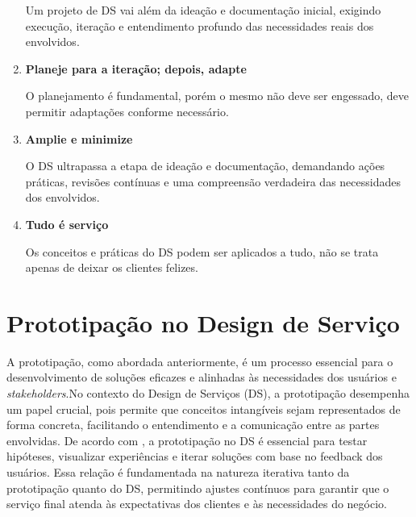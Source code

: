 \begin{enumerate}
	Um projeto de DS vai além da ideação e documentação inicial, exigindo execução, iteração e entendimento profundo das necessidades reais dos envolvidos.
	
	\item \textbf{Planeje para a iteração; depois, adapte}
	
	O planejamento é fundamental, porém o mesmo não deve ser engessado, deve permitir adaptações conforme necessário.
	
	\item \textbf{Amplie e minimize}
	
	O DS ultrapassa a etapa de ideação e documentação, demandando ações práticas, revisões contínuas e uma compreensão verdadeira das necessidades dos envolvidos.
	
	\item \textbf{Tudo é serviço}
	
	Os conceitos e práticas do DS podem ser aplicados a tudo, não se trata apenas de deixar os clientes felizes.
	
\end{enumerate}

\section{Prototipação no Design de Serviço}

A prototipação, como abordada anteriormente, é um processo essencial para o desenvolvimento de soluções eficazes e alinhadas às necessidades dos usuários e \textit{stakeholders}.No contexto do Design de Serviços (DS), a prototipação desempenha um papel crucial, pois permite que conceitos intangíveis sejam representados de forma concreta, facilitando o entendimento e a comunicação entre as partes envolvidas. De acordo com , a prototipação no DS é essencial para testar hipóteses, visualizar experiências e iterar soluções com base no feedback dos usuários. Essa relação é fundamentada na natureza iterativa tanto da prototipação quanto do DS, permitindo ajustes contínuos para garantir que o serviço final atenda às expectativas dos clientes e às necessidades do negócio.


